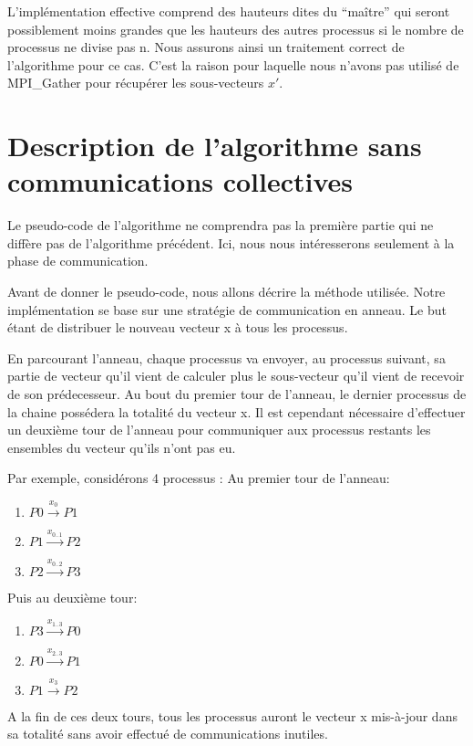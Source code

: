 \documentclass[11pt,a4paper]{report}
\begin{document}
L'implémentation effective comprend des hauteurs dites du ``maître''
qui seront possiblement moins grandes que les hauteurs des autres
processus si le nombre de processus ne divise pas n. Nous assurons
ainsi un traitement correct de l'algorithme pour ce cas.  C'est la
raison pour laquelle nous n'avons pas utilisé de MPI\_Gather pour
récupérer les sous-vecteurs $x'$.


\section{Description de l'algorithme sans communications collectives}

Le pseudo-code de l'algorithme ne comprendra pas la première partie qui
ne diffère pas de l'algorithme précédent. Ici, nous nous intéresserons
seulement à la phase de communication.

Avant de donner le pseudo-code, nous allons décrire la méthode
utilisée.  Notre implémentation se base sur une stratégie de
communication en anneau. Le but étant de distribuer le nouveau vecteur
x à tous les processus.

En parcourant l'anneau, chaque processus va envoyer, au processus
suivant, sa partie de vecteur qu'il vient de calculer plus le
sous-vecteur qu'il vient de recevoir de son prédecesseur. Au bout du
premier tour de l'anneau, le dernier processus de la chaine possédera
la totalité du vecteur x. Il est cependant nécessaire d'effectuer un
deuxième tour de l'anneau pour communiquer aux processus restants les
ensembles du vecteur qu'ils n'ont pas eu.

Par exemple, considérons 4 processus :
Au premier tour de l'anneau:
\begin{enumerate}
\item $P0 \overset{x_0}\longrightarrow P1$
\item $P1 \overset{x_{0..1}}\longrightarrow P2$
\item $P2 \overset{x_{0..2}}\longrightarrow P3$
\end{enumerate}
Puis au deuxième tour:
\begin{enumerate}
\item $P3 \overset{x_{1..3}}\longrightarrow P0$
\item $P0 \overset{x_{2..3}}\longrightarrow P1$
\item $P1 \overset{x_{3}}\longrightarrow P2$
\end{enumerate}
A la fin de ces deux tours, tous les processus auront le vecteur x
mis-à-jour dans sa totalité sans avoir effectué de communications
inutiles.
\end{document}
